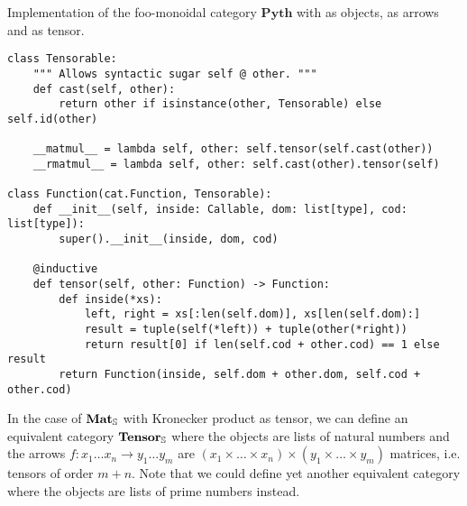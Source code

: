 \begin{python}\label{listing:monoidal.Function}
{\normalfont Implementation of the foo-monoidal category $\mathbf{Pyth}$ with  as objects,  as arrows and  as tensor.}

\begin{verbatim}
class Tensorable:
    """ Allows syntactic sugar self @ other. """
    def cast(self, other):
        return other if isinstance(other, Tensorable) else self.id(other)

    __matmul__ = lambda self, other: self.tensor(self.cast(other))
    __rmatmul__ = lambda self, other: self.cast(other).tensor(self)

class Function(cat.Function, Tensorable):
    def __init__(self, inside: Callable, dom: list[type], cod: list[type]):
        super().__init__(inside, dom, cod)

    @inductive
    def tensor(self, other: Function) -> Function:
        def inside(*xs):
            left, right = xs[:len(self.dom)], xs[len(self.dom):]
            result = tuple(self(*left)) + tuple(other(*right))
            return result[0] if len(self.cod + other.cod) == 1 else result
        return Function(inside, self.dom + other.dom, self.cod + other.cod)
\end{verbatim}
\end{python}

In the case of $\mathbf{Mat}_\S$ with Kronecker product as tensor, we can define an equivalent category $\mathbf{Tensor}_\S$ where the objects are lists of natural numbers and the arrows $f : x_1 \dots x_n \to y_1 \dots y_m$ are $(x_1 \times \dots \times x_n) \times (y_1 \times \dots \times y_m)$ matrices, i.e. tensors of order $m + n$.
Note that we could define yet another equivalent category where the objects are lists of prime numbers instead.

